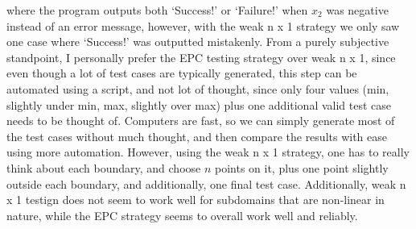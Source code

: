 \documentclass[letterpaper]{article}
\begin{document}
where the program outputs both `Success!'                       
or `Failure!' when $x_2$ was negative instead of an error message, however,
with the weak n x 1 strategy we only saw one case where
`Success!' was outputted mistakenly. From a purely subjective standpoint,
I personally prefer the EPC testing strategy over weak n x 1, since
even though a lot of test cases are typically generated, this step can be
automated using a script, and not lot of thought, since only four values
(min, slightly under min, max, slightly over max) plus one additional
valid test case needs to be thought of. Computers are fast, so we can simply
generate most of the test cases without much thought, and then compare the
results with ease using more automation. However, using the weak n x 1
strategy, one has to really think about each boundary, and choose $n$ points on
it, plus one point slightly outside each boundary, and additionally, one final
test case. Additionally, weak n x 1 testign does not seem to work well for
subdomains that are non-linear in nature, while the EPC strategy seems to
overall work well and reliably.



\vfill
\appendix






\end{document}
